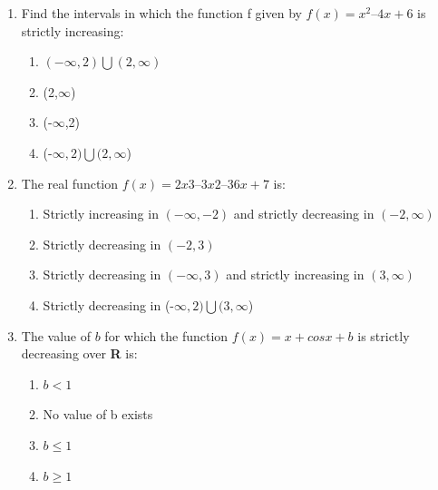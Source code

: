 \documentclass{article}
\begin{document}
\begin{enumerate}
\item Find the intervals in which the function f given by $f(x) = x^2 – 4x + 6$ is strictly
increasing:

\begin{enumerate}

     \item $(-\infty,2) \bigcup (2,\infty)$ 
     
     \item (2,$\infty$) 

     \item (-$\infty$,2) 

     \item (-$\infty,2) \bigcup (2,\infty$) 

\end{enumerate}


\newpage

\item The real function $f(x) = 2x3 – 3x2 – 36x + 7$ is:

\begin{enumerate}

     \item Strictly increasing in $(-\infty,-2)$ and strictly decreasing in $(-2,\infty)$
     
     \item Strictly decreasing in $(-2,3)$ 

     \item Strictly decreasing in $(-\infty,3)$ and strictly increasing in $(3,\infty)$ 

     \item Strictly decreasing in (-$\infty,2) \bigcup (3,\infty$) 

\end{enumerate}


\item The value of $b$  for which the function $f(x) = x + cosx + b$ is strictly decreasing over \textbf{R} is:
\begin{enumerate}

     \item $b < 1$ 
     
     \item No value of b exists 

     \item $b \leq 1$ 

     \item $b \geq 1$ 

\end{enumerate}


\end{enumerate}
\end{document}
